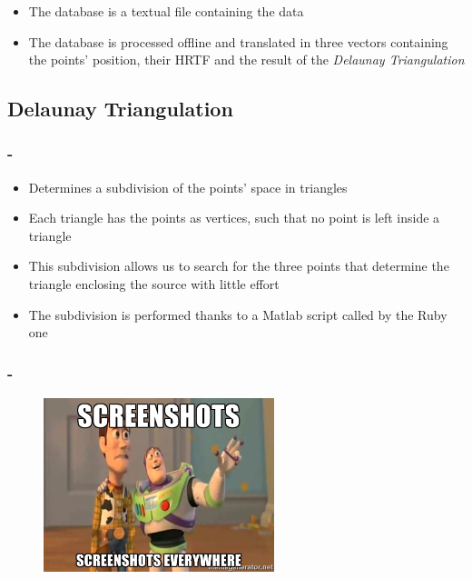 \documentclass{beamer}
\begin{document}
	\begin{frame}
		\frametitle{\insertsection}
		\begin{itemize}
			\item The database is a textual file containing the data
			\item The database is processed offline and translated in three vectors containing the
				points' position, their HRTF and the result of the {\em Delaunay Triangulation}
		\end{itemize}
	\end{frame}

	\subsection{Delaunay Triangulation}

	\begin{frame}
		\frametitle{\insertsection - \insertsubsection}
		\begin{itemize}
			\item Determines a subdivision of the points' space in triangles
			\item Each triangle has the points as vertices, such that no point is left inside a triangle
			\item This subdivision allows us to search for the three points that determine the triangle enclosing the
				source with little effort
			\item The subdivision is performed thanks to a Matlab script called by the Ruby one
		\end{itemize}
	\end{frame}

	\begin{frame}
		\frametitle{\insertsection - \insertsubsection}
		\begin{figure}
			\centering
			  \includegraphics[width=0.6\textwidth]{images/marine.jpg}
		\end{figure}
	\end{frame}
\end{document}
